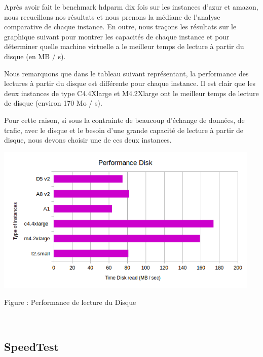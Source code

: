 \documentclass[11pt]{article}
\begin{document}


Après avoir fait le benchmark hdparm dix fois sur les instances d'azur et amazon, nous recueillons nos résultats et nous prenons la médiane de l'analyse comparative de chaque instance. En outre, nous traçons les résultats sur le graphique suivant pour montrer les capacités de chaque instance et pour déterminer quelle machine virtuelle a le meilleur temps de lecture à partir du disque (en MB / s).

Nous remarquons que dans le tableau suivant représentant, la performance des lectures à partir du disque est différente pour chaque instance. Il est clair que les deux instances de type C4.4Xlarge et M4.2Xlarge ont le meilleur temps de lecture de disque (environ 170 Mo / s).

Pour cette raison, si sous la contrainte de beaucoup d'échange de données, de trafic, avec le disque et le besoin d'une grande capacité de lecture à partir de disque, nous devons choisir une de ces deux instances.
~\\
\centerline{\includegraphics[width=0.95\textwidth]{images/disk.png}} %
\centerline{Figure : Performance de lecture du Disque} 
~\\

\pagebreak
\subsection{SpeedTest}
\end{document}
